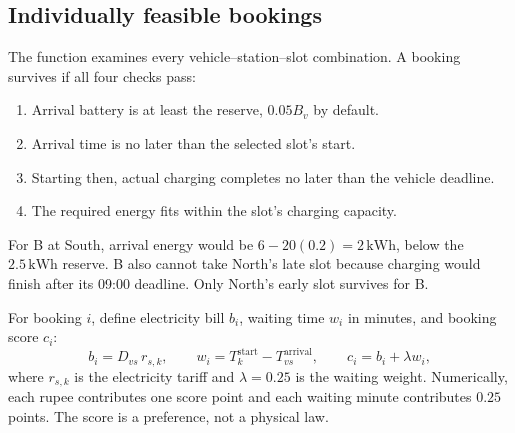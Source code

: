 \subsection{Individually feasible bookings}
The function  examines every vehicle--station--slot
combination. A booking survives if all four checks pass:
\begin{enumerate}
\item Arrival battery is at least the reserve, $0.05B_v$ by default.
\item Arrival time is no later than the selected slot's start.
\item Starting then, actual charging completes no later than the vehicle deadline.
\item The required energy fits within the slot's charging capacity.
\end{enumerate}
For B at South, arrival energy would be $6-20(0.2)=2\,\mathrm{kWh}$, below the
$2.5\,\mathrm{kWh}$ reserve. B also cannot take North's late slot because charging
would finish after its 09:00 deadline. Only North's early slot survives for B.

For booking $i$, define electricity bill $b_i$, waiting time $w_i$ in minutes,
and booking score $c_i$:
\begin{equation}\label{eq:booking-cost}
b_i=D_{vs}\,r_{s,k},\qquad
w_i=T_k^{\mathrm{start}}-T_{vs}^{\mathrm{arrival}},\qquad
c_i=b_i+\lambda w_i,
\end{equation}
where $r_{s,k}$ is the electricity tariff and $\lambda=0.25$ is the waiting weight.
Numerically, each rupee contributes one score point and each waiting minute
contributes $0.25$ points. The score is a preference, not a physical law.

